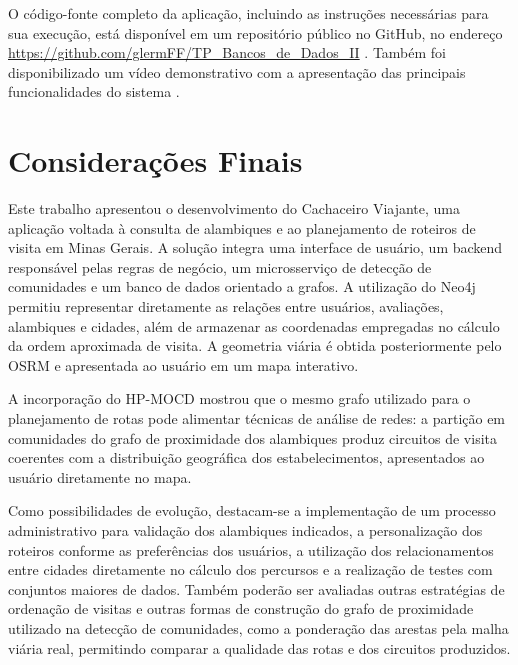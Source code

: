 \documentclass{jaes}
\begin{document}
O código-fonte completo da aplicação, incluindo as instruções necessárias para sua execução, está disponível em um repositório público no GitHub, no endereço \url{https://github.com/glermFF/TP_Bancos_de_Dados_II} \cite{cachaceirogithub}. Também foi disponibilizado um vídeo demonstrativo com a apresentação das principais funcionalidades do sistema \cite{cachaceirovideo}.

\section{Considerações Finais}

Este trabalho apresentou o desenvolvimento do Cachaceiro Viajante, uma aplicação voltada à consulta de alambiques e ao planejamento de roteiros de visita em Minas Gerais. A solução integra uma interface de usuário, um backend responsável pelas regras de negócio, um microsserviço de detecção de comunidades e um banco de dados orientado a grafos. A utilização do Neo4j permitiu representar diretamente as relações entre usuários, avaliações, alambiques e cidades, além de armazenar as coordenadas empregadas no cálculo da ordem aproximada de visita. A geometria viária é obtida posteriormente pelo OSRM e apresentada ao usuário em um mapa interativo.

A incorporação do HP-MOCD \cite{Santos2025} mostrou que o mesmo grafo utilizado para o planejamento de rotas pode alimentar técnicas de análise de redes: a partição em comunidades do grafo de proximidade dos alambiques produz circuitos de visita coerentes com a distribuição geográfica dos estabelecimentos, apresentados ao usuário diretamente no mapa.

Como possibilidades de evolução, destacam-se a implementação de um processo administrativo para validação dos alambiques indicados, a personalização dos roteiros conforme as preferências dos usuários, a utilização dos relacionamentos entre cidades diretamente no cálculo dos percursos e a realização de testes com conjuntos maiores de dados. Também poderão ser avaliadas outras estratégias de ordenação de visitas e outras formas de construção do grafo de proximidade utilizado na detecção de comunidades, como a ponderação das arestas pela malha viária real, permitindo comparar a qualidade das rotas e dos circuitos produzidos.



\end{document}

